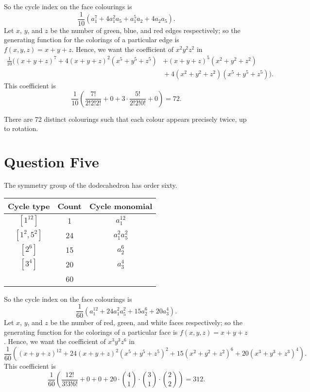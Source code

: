 So the cycle index on the face colourings is
\begin{displaymath}
  \frac{1}{10}(a_1^7 + 4a_1^2 a_5 + a_1^5 a_2 + 4a_2 a_5).
\end{displaymath}
Let $ x $, $ y $, and $ z $ be the number of green, blue, and red edges respectively; so the generating function for
the colorings of a particular edge is $ f(x,y,z) = x + y + z $. Hence, we want the coefficient of $ x^2 y^2 z^2 $ in
\begin{displaymath}
  \begin{split}
    \frac{1}{10}((x + y + z)^7 + 4(x + y + z)^2 (x^5 + y^5 + z^5) &+ (x + y + z)^5 (x^2 + y^2 + z^2)\\
    &{}+ 4(x^2 + y^2 + z^2)(x^5 + y^5 + z^5)).
  \end{split}
\end{displaymath}
This coefficient is
\begin{displaymath}
  \frac{1}{10}\left(\frac{7!}{2!2!2!} + 0 + 3 \cdot \frac{5!}{2!2!0!} + 0\right) = 72.
\end{displaymath}

There are 72 distinct colourings such that each colour appears precisely twice, up to rotation.

\section*{Question Five}
The symmetry group of the dodecahedron has order sixty.
\begin{center}\begin{tabular}{|c|c|c|}\hline
  \textbf{Cycle type} & \textbf{Count} & \textbf{Cycle monomial}\\\hline
  $ [1^{12}] $ & 1 & $ a_1^{12} $\\
  $ [1^2,5^2] $ & 24 & $ a_1^2a_5^2 $\\
  $ [2^6] $ & 15 & $ a_2^6 $\\
  $ [3^4] $ & 20 & $ a_3^4 $\\\hline
   & 60 &\\\hline
\end{tabular}\end{center}

So the cycle index on the face colourings is
\begin{displaymath}
  \frac{1}{60}(a_1^{12} + 24a_1^2a_5^2 + 15a_2^6 + 20a_3^4).
\end{displaymath}
Let $ x $, $ y $, and $ z $ be the number of red, green, and white faces respectively; so the generating function for
the colorings of a particular face is $ f(x,y,z) = x + y + z $. Hence, we want the coefficient of $ x^3y^3z^6 $ in
\begin{displaymath}
  \frac{1}{60}\left((x+y+z)^{12} + 24(x+y+z)^2(x^5+y^5+z^5)^2 + 15(x^2+y^2+z^2)^6 + 20(x^3+y^3+z^3)^4\right).
\end{displaymath}
This coefficient is
\begin{displaymath}
  \frac{1}{60}\left(\frac{12!}{3!3!6!} + 0 + 0 + 20\cdot\binom{4}{1}\cdot\binom{3}{1}\cdot\binom{2}{2}\right) = 312.
\end{displaymath}
